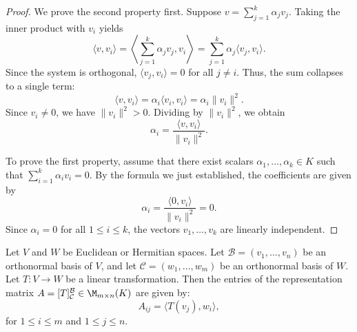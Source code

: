 \begin{proof}
    We prove the second property first. Suppose $v = \sum_{j=1}^k \alpha_j v_j$. Taking the inner product with $v_i$ yields
    \begin{equation*}
        \langle v, v_i \rangle = \left\langle \sum_{j=1}^k \alpha_j v_j, v_i \right\rangle = \sum_{j=1}^k \alpha_j \langle v_j, v_i \rangle.
    \end{equation*}
    Since the system is orthogonal, $\langle v_j, v_i \rangle = 0$ for all $j \neq i$. Thus, the sum collapses to a single term:
    \begin{equation*}
        \langle v, v_i \rangle = \alpha_i \langle v_i, v_i \rangle = \alpha_i \|v_i\|^2.
    \end{equation*}
    Since $v_i \neq 0$, we have $\|v_i\|^2 > 0$. Dividing by $\|v_i\|^2$, we obtain
    \begin{equation*}
        \alpha_i = \frac{\langle v, v_i \rangle}{\|v_i\|^2}.
    \end{equation*}
    
    To prove the first property, assume that there exist scalars $\alpha_1, \dots, \alpha_k \in K$ such that $\sum_{i=1}^k \alpha_i v_i = 0$. By the formula we just established, the coefficients are given by
    \begin{equation*}
        \alpha_i = \frac{\langle 0, v_i \rangle}{\|v_i\|^2} = 0.
    \end{equation*}
    Since $\alpha_i = 0$ for all $1 \leq i \leq k$, the vectors $v_1, \dots, v_k$ are linearly independent.
\end{proof}

\begin{proposition}
    Let $V$ and $W$ be Euclidean or Hermitian spaces. Let $\mathcal{B} = (v_1, \dots, v_n)$ be an orthonormal basis of $V$, and let $\mathcal{C} = (w_1, \dots, w_m)$ be an orthonormal basis of $W$. Let $T: V \to W$ be a linear transformation. Then the entries of the representation matrix $A = [T]_{\mathcal{C}}^{\mathcal{B}} \in \M_{m \times n}(K)$ are given by:
    \begin{equation*}
        A_{ij} = \langle T(v_j), w_i \rangle,
    \end{equation*}
    for $1 \leq i \leq m$ and $1 \leq j \leq n$.
\end{proposition}


